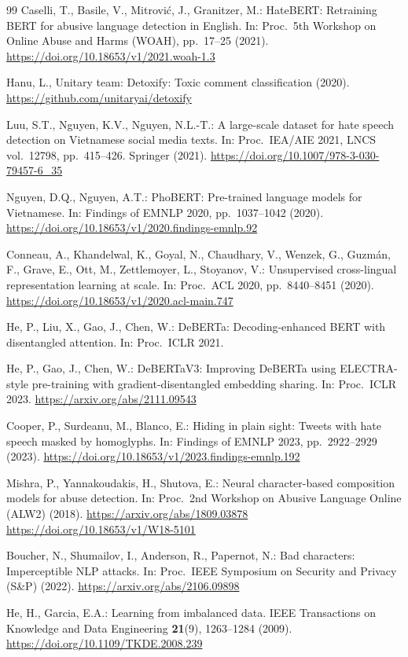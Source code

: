 \documentclass[runningheads]{llncs}
\providecommand{\doi}[1]{\url{https://doi.org/#1}}
\providecommand{\arxiv}[1]{\url{https://arxiv.org/abs/#1}}
\begin{document}
\begin{thebibliography}{99}
Caselli, T., Basile, V., Mitrovi\'{c}, J., Granitzer, M.: HateBERT: Retraining BERT for abusive language detection in English. In: Proc.\ 5th Workshop on Online Abuse and Harms (WOAH), pp.~17--25 (2021).
\doi{10.18653/v1/2021.woah-1.3}

Hanu, L., Unitary team: Detoxify: Toxic comment classification (2020). \url{https://github.com/unitaryai/detoxify}

Luu, S.T., Nguyen, K.V., Nguyen, N.L.-T.: A large-scale dataset for hate speech detection on Vietnamese social media texts. In: Proc.\ IEA/AIE 2021, LNCS vol.~12798, pp.~415--426. Springer (2021). \doi{10.1007/978-3-030-79457-6\_35}

Nguyen, D.Q., Nguyen, A.T.: PhoBERT: Pre-trained language models for Vietnamese. In: Findings of EMNLP 2020, pp.~1037--1042 (2020).
\doi{10.18653/v1/2020.findings-emnlp.92}

Conneau, A., Khandelwal, K., Goyal, N., Chaudhary, V., Wenzek, G., Guzm\'{a}n, F., Grave, E., Ott, M., Zettlemoyer, L., Stoyanov, V.: Unsupervised cross-lingual representation learning at scale. In: Proc.\ ACL 2020, pp.~8440--8451 (2020).
\doi{10.18653/v1/2020.acl-main.747}

He, P., Liu, X., Gao, J., Chen, W.: DeBERTa: Decoding-enhanced BERT with disentangled attention. In: Proc.\ ICLR 2021.

He, P., Gao, J., Chen, W.: DeBERTaV3: Improving DeBERTa using ELECTRA-style pre-training with gradient-disentangled embedding sharing. In: Proc.\ ICLR 2023. \arxiv{2111.09543}

Cooper, P., Surdeanu, M., Blanco, E.: Hiding in plain sight: Tweets with hate speech masked by homoglyphs. In: Findings of EMNLP 2023, pp.~2922--2929 (2023).
\doi{10.18653/v1/2023.findings-emnlp.192}

Mishra, P., Yannakoudakis, H., Shutova, E.: Neural character-based composition models for abuse detection. In: Proc.\ 2nd Workshop on Abusive Language Online (ALW2) (2018). \arxiv{1809.03878}
\doi{10.18653/v1/W18-5101}

Boucher, N., Shumailov, I., Anderson, R., Papernot, N.: Bad characters: Imperceptible NLP attacks. In: Proc.\ IEEE Symposium on Security and Privacy (S\&P) (2022). \arxiv{2106.09898}

He, H., Garcia, E.A.: Learning from imbalanced data. IEEE Transactions on Knowledge and Data Engineering \textbf{21}(9), 1263--1284 (2009).
\doi{10.1109/TKDE.2008.239}


\end{thebibliography}
\end{document}
